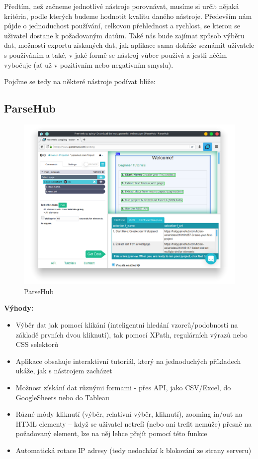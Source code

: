 \documentclass[thesis=B,czech]{FITthesis}[2012/06/26]
\begin{document}
Předtím, než začneme jednotlivé nástroje porovnávat, musíme si určit nějaká kritéria, podle kterých budeme hodnotit kvalitu daného nástroje. Především nám půjde o jednoduchost používání, celkovou přehlednost a rychlost, se kterou se uživatel dostane k požadovaným datům. Také nás bude zajímat způsob výběru dat, možnosti exportu získaných dat, jak aplikace sama dokáže seznámit uživatele s používáním a také, v jaké formě se nástroj vůbec používá a jestli něčím vybočuje (a\v{t} už v pozitivním nebo negativním smyslu). 

Poj\v{d}me se tedy na některé nástroje podívat blíže:

\subsection{ParseHub}
\begin{figure}[h]
	\includegraphics[width=\linewidth]{images/ParseHub.png}
	\caption{ParseHub}
	\label{fig:parseHub}
\end{figure}

\textbf{Výhody:}
\begin{itemize}
	\item Výběr dat jak pomocí klikání (inteligentní hledání vzorců/podobností na základě prvních dvou kliknutí), tak pomocí XPath, regulárních výrazů nebo CSS selektorů
	\item Aplikace obsahuje interaktivní tutoriál, který na jednoduchých příkladech ukáže, jak s nástrojem zacházet
	\item Možnost získání dat různými formami - přes API, jako CSV/Excel, do GoogleSheets nebo do Tableau
	\item Různé módy kliknutí (výběr, relativní výběr, kliknutí), zooming in/out na HTML elementy -- když se uživatel netrefí (nebo ani trefit nemůže) přesně na požadovaný element, lze na něj lehce přejít pomocí této funkce
	\item Automatická rotace IP adresy (tedy nedochází k blokování ze strany serveru)
\end{itemize}
\end{document}

